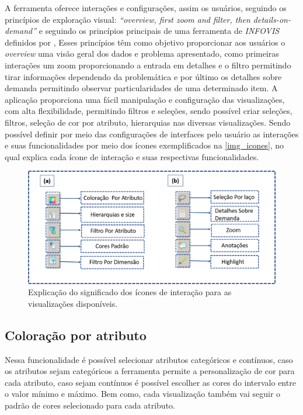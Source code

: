 \documentclass[
	12pt,				%
	openright,			%
	oneside,			%
	a4paper,			%
	english,			%
	brazil				%
	]{abntex2}
\begin{document}
A ferramenta oferece interações e configurações, assim os usuários, seguindo os princípios de exploração visual:  \textit{“overview, first zoom and filter, then details-on-demand”} e seguindo os princípios principais de uma ferramenta de \textit{INFOVIS} definidos por \cite{Shneiderman1996},
Esses princípios têm como objetivo proporcionar aos usuários o \textit{overview} uma visão geral dos dados e problema apresentado, como primeiras interações um zoom proporcionando a entrada em detalhes e o filtro permitindo tirar informações dependendo da problemática e por último os detalhes sobre demanda permitindo observar particularidades de uma determinado item. A aplicação proporciona uma fácil manipulação e configuração das visualizações, com alta flexibilidade, permitindo filtros e seleções, sendo possível criar seleções, filtros, seleção de cor por atributo, hierarquias nas diversas visualizações. Sendo possível definir por meio das configurações de interfaces pelo usuário as interações e suas funcionalidades por meio dos ícones exemplificados na \autoref{img_icones}, no qual explica cada ícone de interação e suas respectivas funcionalidades.


\begin{figure}[ht]
	\caption{\label{img_icones} Explicação do significado dos ícones de interação para as visualizações disponíveis.
}
	\begin{center}
	    \includegraphics[width=30pc]{figures/img_icones.png}
	\end{center}
\end{figure}

     

\subsection{Coloração por atributo}
Nessa funcionalidade é possível selecionar atributos categóricos e contínuos, caso os atributos sejam categóricos a ferramenta permite a personalização de cor para cada atributo, caso sejam contínuos é possível escolher as cores do intervalo entre o valor mínimo e máximo. Bem como, cada visualização também vai seguir o padrão de cores selecionado para cada atributo.
\end{document}
